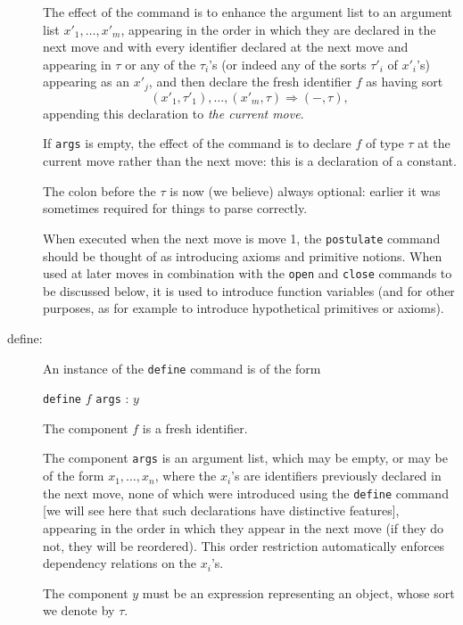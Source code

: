 \documentclass[12pt]{article}
\begin{document}
\begin{description}
The effect of the command is to enhance the argument list
to an argument list $x'_1,\ldots,x'_m$, appearing in the order in which they are declared in the next move and with every identifier declared at the next
move and appearing in $\tau$ or any of the $\tau_i$'s (or indeed any of the sorts $\tau'_i$ of $x'_i$'s) appearing as an $x'_j$, and then declare the fresh identifier $f$
as having sort $$(x'_1,\tau'_1),\ldots,(x'_m,\tau)\Rightarrow (-,\tau),$$ appending this declaration to {\em the current move\/}.    

If {\tt args} is empty, the effect of the command is to declare $f$ of type $\tau$ at the current move rather than the next move:  this is a declaration of a constant.  

The colon before the $\tau$ is now (we believe) always optional:  earlier it was sometimes required for things to parse correctly.

When executed when the next move is move 1, the {\tt postulate} command should be thought of as introducing  axioms and primitive notions.  When used at later moves in combination with the {\tt open} and {\tt close} commands to be discussed below, it is used to introduce function variables (and for other purposes, as for example to introduce hypothetical primitives or axioms). 

\item[define:]  An instance of the {\tt define} command is of the form 

{\tt define} $f$ {\tt args} : $y$

The component $f$ is a fresh identifier.

The component {\tt args} is an argument list, which may be empty, or may be of the form $x_1,\ldots,x_n$, where the $x_i$'s are identifiers previously declared in the next move, none of which were introduced using the {\tt define} command [we will see here that such declarations have distinctive features], appearing in the order in which they appear in the next move (if they do not, they will be reordered).  This order restriction automatically enforces dependency relations
on the $x_i$'s. 
 
The component $y$ must be an expression representing an object, whose sort we denote by $\tau$.  


\end{description}
\end{document}
